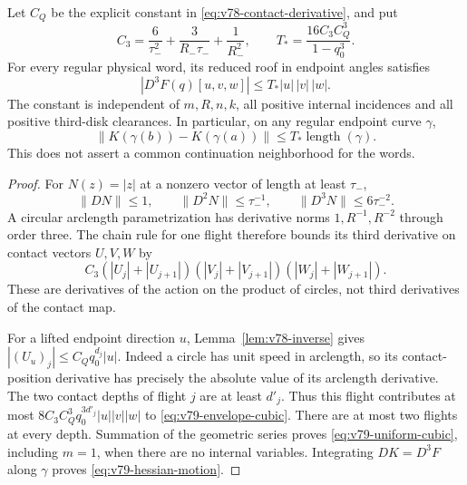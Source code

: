\begin{theorem}
\label{thm:v79-uniform-cubic}
Let $C_Q$ be the explicit constant in
\eqref{eq:v78-contact-derivative}, and put
\begin{equation}\label{eq:v79-cubic-constant}
 C_3=\frac6{\tau_-^2}+\frac3{R_-\tau_-}+\frac1{R_-^2},
 \qquad T_* =\frac{16 C_3 C_Q^3}{1-q_0^3}.
\end{equation}
For every regular physical word, its reduced roof in endpoint angles
satisfies
\begin{equation}\label{eq:v79-uniform-cubic}
 |D^3F(q)[u,v,w]|\le T_*|u|\,|v|\,|w|.
\end{equation}
The constant is independent of $m,R,n,k$, all positive internal
incidences and all positive third-disk clearances. In particular,
on any regular endpoint curve $\gamma$,
\begin{equation}\label{eq:v79-hessian-motion}
 \|K(\gamma(b))-K(\gamma(a))\|
                       \le T_*\operatorname{length}(\gamma).
\end{equation}
This does not assert a common continuation neighborhood for the words.
\end{theorem}
\begin{proof}
For $N(z)=|z|$ at a nonzero vector of length at least $\tau_-$,
\[
 \|DN\|\le1,\qquad \|D^2N\|\le\tau_-^{-1},\qquad
                           \|D^3N\|\le6\tau_-^{-2}.
\]
A circular arclength parametrization has derivative norms
$1,R^{-1},R^{-2}$ through order three. The chain rule for one flight
therefore bounds its third derivative on contact vectors $U,V,W$ by
\[
 C_3(|U_j|+|U_{j+1}|)(|V_j|+|V_{j+1}|)(|W_j|+|W_{j+1}|).
\]
These are derivatives of the action on the product of circles, not
third derivatives of the contact map.

For a lifted endpoint direction $u$, Lemma~\ref{lem:v78-inverse}
gives $|(U_u)_j|\le C_Qq_0^{d_j}|u|$. Indeed a circle has unit speed
in arclength, so its contact-position derivative has precisely the
absolute value of its arclength derivative. The two contact depths
of flight $j$ are at least $d'_j$. Thus this flight contributes at
most $8C_3C_Q^3q_0^{3d'_j}|u||v||w|$ to
\eqref{eq:v79-envelope-cubic}. There are at most two flights at every
depth. Summation of the geometric series proves
\eqref{eq:v79-uniform-cubic}, including $m=1$, when there are no
internal variables. Integrating $DK=D^3F$ along $\gamma$ proves
\eqref{eq:v79-hessian-motion}.
\end{proof}

